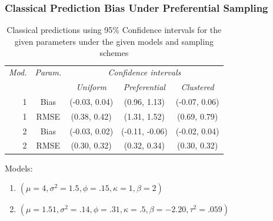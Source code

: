 \documentclass[xcolor=svgnames]{beamer}
\begin{document}
\begin{frame}
\frametitle{Classical Prediction Bias Under Preferential Sampling}
\begin{table}[ht]
\centering
\begin{tabular}{|r|cccc|}
\hline
\emph{Mod.} &  \emph{Param.} &  \multicolumn{3}{c|}{\emph{Confidence intervals}}  \\ \cline{3-5}
& & \emph{Uniform} & \emph{Preferential} & \emph{Clustered} \\
\hline
1 & Bias & (-0.03, 0.04) & (0.96, 1.13) & (-0.07, 0.06) \\ 
1 & RMSE & (0.38, 0.42) & (1.31, 1.52) & (0.69, 0.79) \\ 
2 & Bias & (-0.03, 0.02) & (-0.11, -0.06) & (-0.02, 0.04) \\
2 & RMSE & (0.30, 0.32) & (0.32, 0.34)& (0.30, 0.32) \\
\hline
\end{tabular}
\caption{Classical predictions using 95\% Confidence intervals for the given parameters under the given models and sampling schemes}
\end{table}
Models:
\begin{enumerate}
\item $(\mu=4, \sigma^2=1.5, \phi=.15, \kappa=1, \beta=2)$
\item $(\mu=1.51, \sigma^2=.14, \phi=.31, \kappa=.5, \beta=-2.20, \tau^2=.059)$
\end{enumerate}

\end{frame}
\end{document}
